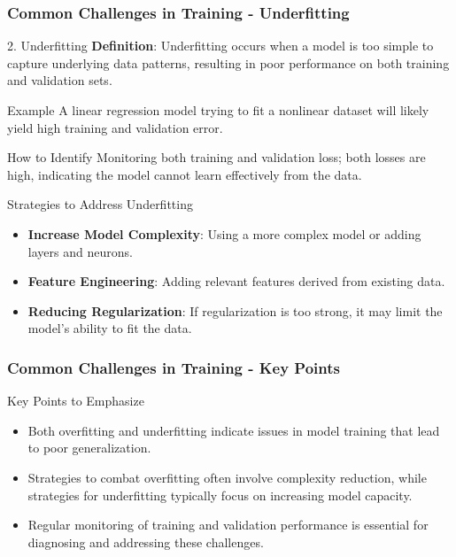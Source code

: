 \documentclass[aspectratio=169]{beamer}
\begin{document}
\begin{frame}[fragile]
    \frametitle{Common Challenges in Training - Underfitting}
    \begin{block}{2. Underfitting}
        \textbf{Definition}: Underfitting occurs when a model is too simple to capture underlying data patterns, resulting in poor performance on both training and validation sets.
    \end{block}
    
    \begin{exampleblock}{Example}
        A linear regression model trying to fit a nonlinear dataset will likely yield high training and validation error.
    \end{exampleblock}
    
    \begin{block}{How to Identify}
        Monitoring both training and validation loss; both losses are high, indicating the model cannot learn effectively from the data.
    \end{block}

    \begin{block}{Strategies to Address Underfitting}
        \begin{itemize}
            \item \textbf{Increase Model Complexity}: Using a more complex model or adding layers and neurons.
            \item \textbf{Feature Engineering}: Adding relevant features derived from existing data.
            \item \textbf{Reducing Regularization}: If regularization is too strong, it may limit the model's ability to fit the data.
        \end{itemize}
    \end{block}
\end{frame}

\begin{frame}[fragile]
    \frametitle{Common Challenges in Training - Key Points}
    \begin{block}{Key Points to Emphasize}
        \begin{itemize}
            \item Both overfitting and underfitting indicate issues in model training that lead to poor generalization.
            \item Strategies to combat overfitting often involve complexity reduction, while strategies for underfitting typically focus on increasing model capacity.
            \item Regular monitoring of training and validation performance is essential for diagnosing and addressing these challenges.
        \end{itemize}
    \end{block}
\end{frame}
\end{document}
